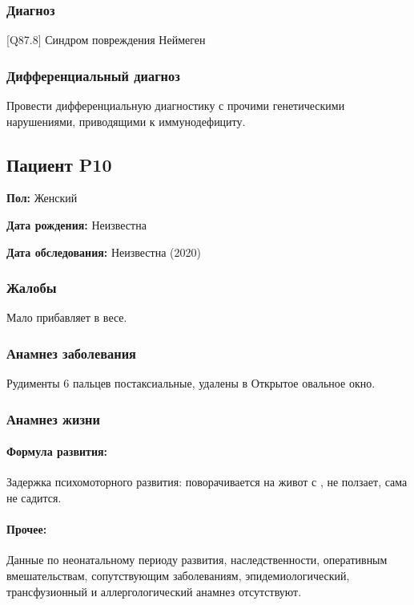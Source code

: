 \documentclass[a4paper,14pt]{extarticle}
\newcommand{\months}{мес.}
\newcommand{\DS}[2]{[#2] #1}
\begin{document}
\subsubsection*{Диагноз}

\DS{Синдром повреждения Неймеген}{Q87.8}

\subsubsection*{Дифференциальный диагноз}

Провести дифференциальную диагностику с прочими генетическими нарушениями, приводящими к иммунодефициту.

\newpage
\subsection*{Пациент P10}

\textbf{Пол:} Женский

\textbf{Дата рождения:} Неизвестна

\textbf{Дата обследования:} Неизвестна (2020)

\subsubsection*{Жалобы}

Мало прибавляет в весе.

\subsubsection*{Анамнез заболевания}

Рудименты 6 пальцев постаксиальные, удалены в \numprint[\months]{6}
Открытое овальное окно.

\subsubsection*{Анамнез жизни}

\paragraph{Формула развития:} Задержка психомоторного развития: поворачивается на живот с \numprint[\months]{6}, не ползает, сама не садится. 

\paragraph{Прочее:} Данные по неонатальному периоду развития, наследственности, оперативным вмешательствам, сопутствующим заболеваниям, эпидемиологический, трансфузионный и аллергологический анамнез отсутствуют.
\end{document}

